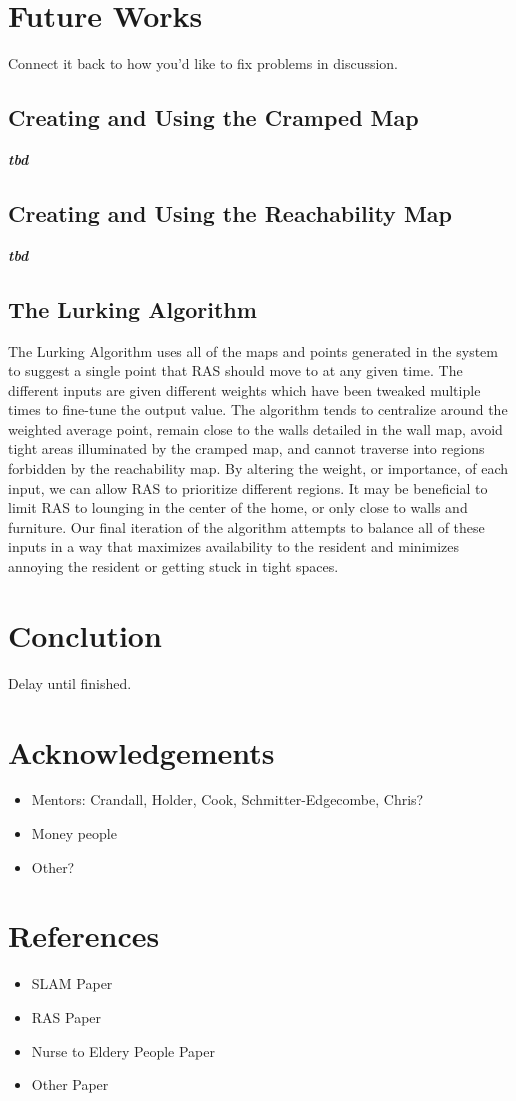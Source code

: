 \documentclass[11pt, conference, a4paper]{IEEEtran}
\begin{document}
\section{Future Works}
Connect it back to how you'd like to fix problems in discussion.


\subsection{Creating and Using the Cramped Map}
\textit{\textbf{tbd}}

\subsection{Creating and Using the Reachability Map}
\textit{\textbf{tbd}} 

\subsection{The Lurking Algorithm}
The Lurking Algorithm uses all of the maps and points generated in the system to suggest a single point that RAS should move to at any given time. The different inputs are given different weights which have been tweaked multiple times to fine-tune the output value. The algorithm tends to centralize around the weighted average point, remain close to the walls detailed in the wall map, avoid tight areas illuminated by the cramped map, and cannot traverse into regions forbidden by the reachability map. By altering the weight, or importance, of each input, we can allow RAS to prioritize different regions. It may be beneficial to limit RAS to lounging in the center of the home, or only close to walls and furniture. Our final iteration of the algorithm attempts to balance all of these inputs in a way that maximizes availability to the resident and minimizes annoying the resident or getting stuck in tight spaces. 

\section{Conclution}
Delay until finished.

\section{Acknowledgements}
\begin{itemize}
    \item Mentors: Crandall, Holder, Cook, Schmitter-Edgecombe, Chris?
    \item Money people
    \item Other?
\end{itemize}


\section{References}
\begin{itemize}
    \item SLAM Paper
    \item RAS Paper
    \item Nurse to Eldery People Paper
    \item Other Paper
\end{itemize}
\end{document}
